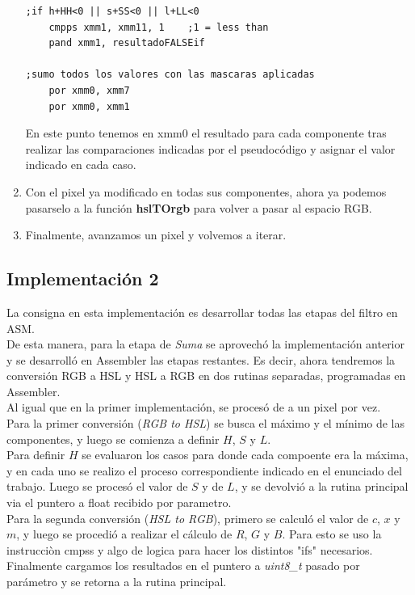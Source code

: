 \begin{enumerate}
\begin{lstlisting}
;if h+HH<0 || s+SS<0 || l+LL<0
	cmpps xmm1,	xmm11, 1	;1 = less than
	pand xmm1, resultadoFALSEif

;sumo todos los valores con las mascaras aplicadas
	por xmm0, xmm7
	por xmm0, xmm1
\end{lstlisting}
En este punto tenemos en xmm0 el resultado para cada componente tras realizar las comparaciones indicadas por el pseudocódigo y asignar el valor indicado en cada caso. 
\item Con el pixel ya modificado en todas sus componentes, ahora ya podemos pasarselo a la función \textbf{hslTOrgb} para volver a pasar al espacio RGB.
\item Finalmente, avanzamos un pixel y volvemos a iterar.

\end{enumerate}

\subsection{Implementación 2}
La consigna en esta implementación es desarrollar todas las etapas del filtro en ASM.\\
De esta manera, para la etapa de \textit{Suma} se aprovechó la implementación anterior y se desarrolló en Assembler las etapas restantes. Es decir, ahora tendremos la conversión RGB a HSL y HSL a RGB en dos rutinas separadas, programadas en Assembler.\\

Al igual que en la primer implementación, se procesó de a un pixel por vez.\\

Para la primer conversión (\textit{RGB to HSL}) se busca el máximo y el mínimo de las componentes, y luego se comienza a definir $H$, $S$ y $L$.\\
Para definir $H$ se evaluaron los casos para donde cada compoente era la máxima, y en cada uno se realizo el proceso correspondiente indicado en el enunciado del trabajo. Luego se procesó el valor de $S$ y de $L$, y se devolvió a la rutina principal via el puntero a float recibido por parametro.\\

Para la segunda conversión (\textit{HSL to RGB}), primero se calculó el valor de $c$, $x$ y $m$, y luego se procedió a realizar el cálculo de $R$, $G$ y $B$. Para esto se uso la instrucciòn cmpss y algo de logica para hacer los distintos "ifs" necesarios.\\
Finalmente cargamos los resultados en el puntero a \textit{uint8\_t} pasado por parámetro y se retorna a la rutina principal.\\

